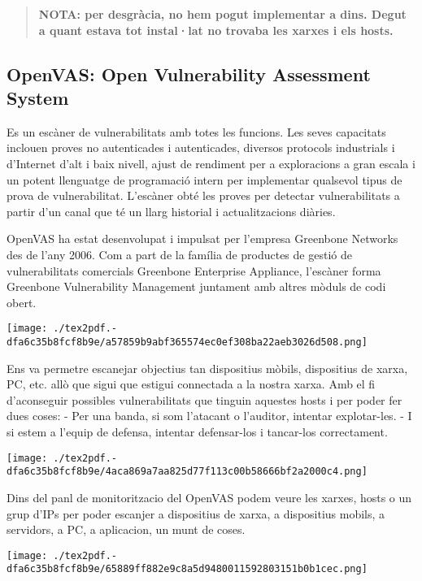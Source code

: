 \documentclass[]{article}
\begin{document}
\begin{quote}
\textbf{NOTA: per desgràcia, no hem pogut implementar a dins. Degut a
quant estava tot instal·lat no trovaba les xarxes i els hosts.}
\end{quote}

\hypertarget{openvas-open-vulnerability-assessment-system}{%
\subsection{\texorpdfstring{\textbf{OpenVAS}: Open Vulnerability
Assessment
System}{OpenVAS: Open Vulnerability Assessment System}}\label{openvas-open-vulnerability-assessment-system}}

Es un escàner de vulnerabilitats amb totes les funcions. Les seves
capacitats inclouen proves no autenticades i autenticades, diversos
protocols industrials i d'Internet d'alt i baix nivell, ajust de
rendiment per a exploracions a gran escala i un potent llenguatge de
programació intern per implementar qualsevol tipus de prova de
vulnerabilitat. L'escàner obté les proves per detectar vulnerabilitats a
partir d'un canal que té un llarg historial i actualitzacions diàries.

OpenVAS ha estat desenvolupat i impulsat per l'empresa Greenbone
Networks des de l'any 2006. Com a part de la família de productes de
gestió de vulnerabilitats comercials Greenbone Enterprise Appliance,
l'escàner forma Greenbone Vulnerability Management juntament amb altres
mòduls de codi obert.

\texttt{[image: ./tex2pdf.-dfa6c35b8fcf8b9e/a57859b9abf365574ec0ef308ba22aeb3026d508.png]}

Ens va permetre escanejar objectius tan dispositius mòbils, dispositius
de xarxa, PC, etc. allò que sigui que estigui connectada a la nostra
xarxa. Amb el fi d'aconseguir possibles vulnerabilitats que tinguin
aquestes hosts i per poder fer dues coses: - Per una banda, si som
l'atacant o l'auditor, intentar explotar-les. - I si estem a l'equip de
defensa, intentar defensar-los i tancar-los correctament.

\texttt{[image: ./tex2pdf.-dfa6c35b8fcf8b9e/4aca869a7aa825d77f113c00b58666bf2a2000c4.png]}

Dins del panl de monitoritzacio del OpenVAS podem veure les xarxes,
hosts o un grup d'IPs per poder escanjer a dispositius de xarxa, a
dispositius mobils, a servidors, a PC, a aplicacion, un munt de coses.

\texttt{[image: ./tex2pdf.-dfa6c35b8fcf8b9e/65889ff882e9c8a5d9480011592803151b0b1cec.png]}
\end{document}
